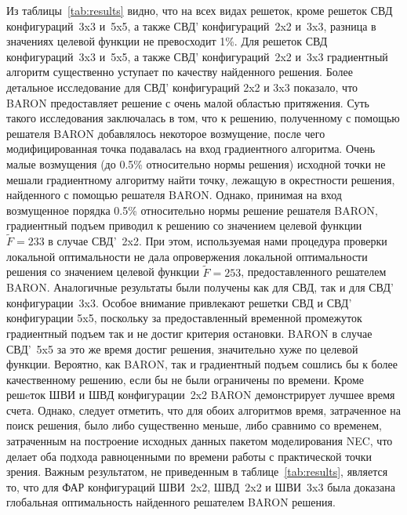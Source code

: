 Из таблицы~\ref{tab:results} видно, что на всех видах решеток, кроме решеток СВД конфигураций~3x3 и~5x5, а также СВД' конфигураций~2x2 и~3x3, разница в значениях целевой функции не превосходит 1\%. Для решеток СВД конфигураций~3x3 и~5x5, а также СВД' конфигураций~2x2 и~3x3 градиентный алгоритм существенно уступает по качеству найденного решения. Более детальное исследование для СВД' конфигураций 2x2 и 3x3 показало, что BARON предоставляет решение с очень малой областью притяжения. Суть такого исследования заключалась в том, что к решению, полученному с помощью решателя BARON добавлялось некоторое возмущение, после чего модифицированная точка подавалась на вход градиентного алгоритма. Очень малые возмущения (до 0.5\% относительно нормы решения) исходной точки не мешали градиентному алгоритму найти точку, лежащую в окрестности решения, найденного с помощью решателя BARON. Однако, принимая на вход возмущенное порядка 0.5\% относительно нормы решение решателя BARON, градиентный подъем приводил к решению со значением целевой функции $\tilde{F} = 233$  в случае СВД'~2x2. При этом, используемая нами процедура проверки локальной оптимальности не дала опровержения локальной оптимальности решения со значением целевой функции $\tilde{F} = 253$, предоставленного решателем BARON. Аналогичные результаты были получены как для СВД, так и для СВД' конфигурации~3x3. Особое внимание привлекают решетки СВД и СВД' конфигурации 5x5, поскольку за предоставленный временной промежуток градиентный подъем так и не достиг критерия остановки. BARON в случае СВД'~5x5 за это же время достиг решения, значительно хуже по целевой функции. Вероятно, как BARON, так и градиентный подъем сошлись бы к более качественному решению, если бы не были ограничены по времени. Кроме решeток ШВИ и ШВД конфигурации~2x2 BARON демонстрирует лучшее время счета. Однако, следует отметить, что для обоих алгоритмов время, затраченное на поиск решения, было либо существенно меньше, либо сравнимо со временем, затраченным на построение исходных данных пакетом моделирования NEC, что делает оба подхода равноценными по времени работы с практической точки зрения. Важным результатом, не приведенным в таблице~\ref{tab:results}, является то, что для ФАР конфигураций ШВИ~2x2, ШВД~2x2 и ШВИ~3x3 была доказана глобальная оптимальность найденного решателем BARON решения.

